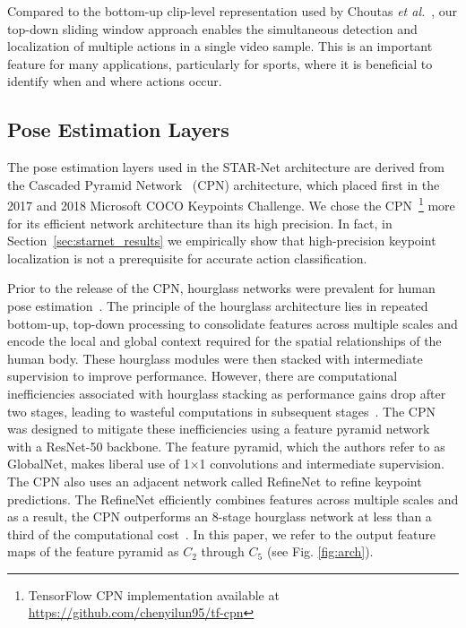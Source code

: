 \documentclass[10pt, conference, compsocconf]{IEEEtran}
\begin{document}
Compared to the bottom-up clip-level representation used by Choutas \textit{et al.}~\cite{choutas2018potion}, our top-down sliding window approach enables the simultaneous detection and localization of multiple actions in a single video sample. This is an important feature for many applications, particularly for sports, where it is beneficial to identify when and where actions occur.

\subsection{Pose Estimation Layers}

The pose estimation layers used in the STAR-Net architecture are derived from the Cascaded Pyramid Network~\cite{chen2017cascaded} (CPN) architecture, which placed first in the 2017 and 2018 Microsoft COCO Keypoints Challenge. We chose the CPN~\footnote{TensorFlow CPN implementation available at \url{https://github.com/chenyilun95/tf-cpn}} more for its efficient network architecture than its high precision. In fact, in Section~\ref{sec:starnet_results} we empirically show that high-precision keypoint localization is not a prerequisite for accurate action classification.  

Prior to the release of the CPN, hourglass networks were prevalent for human pose estimation~\cite{newell2016stacked}. The principle of the hourglass architecture lies in repeated bottom-up, top-down processing to consolidate features across multiple scales and encode the local and global context required for the spatial relationships of the human body. These hourglass modules were then stacked with intermediate supervision to improve performance. However, there are computational inefficiencies associated with hourglass stacking as performance gains drop after two stages, leading to wasteful computations in subsequent stages~\cite{chen2017cascaded}. The CPN was designed to mitigate these inefficiencies using a feature pyramid network~\cite{lin2017feature} with a ResNet-50 \cite{he2016deep} backbone. The feature pyramid, which the authors refer to as GlobalNet, makes liberal use of 1$\times$1 convolutions and intermediate supervision. The CPN also uses an adjacent network called RefineNet to refine keypoint predictions. The RefineNet efficiently combines features across multiple scales and as a result, the CPN outperforms an 8-stage hourglass network at less than a third of the computational cost~\cite{chen2017cascaded}. In this paper, we refer to the output feature maps of the feature pyramid as $C_2$ through $C_5$ (see Fig. \ref{fig:arch}).  
\end{document}
